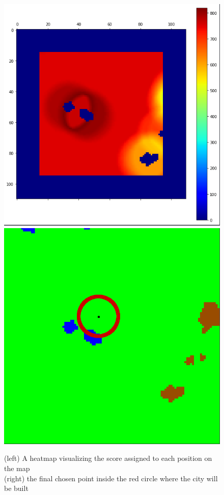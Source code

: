 \documentclass{scrartcl}
\begin{document}
\begin{figure}
  \centering
  \includegraphics[scale = 0.25]{heatmap_citycenter}
  \includegraphics[scale = 0.2]{terrain_citycenter_circle}
  \caption{(left) A heatmap visualizing the score assigned to each position on the map\\
          (right) the final chosen point inside the red circle where the city will be built}
\end{figure}
\end{document}
